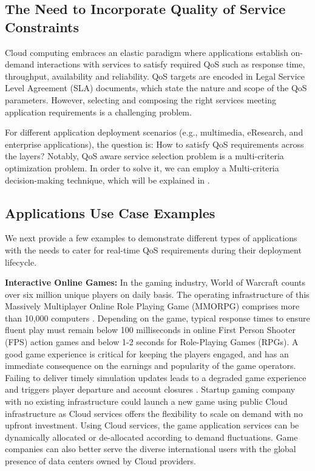 \subsection{The Need to Incorporate Quality of Service Constraints}
\label{sec:qos}

Cloud computing embraces an elastic paradigm where applications establish on-demand interactions with services to satisfy required QoS such as response time, throughput, availability and reliability. QoS targets are encoded in Legal Service Level Agreement (SLA) documents, which state the nature and scope of the QoS parameters. However, selecting and composing the right services meeting application requirements is a challenging problem.

For different application deployment scenarios (e.g., multimedia, eResearch, and enterprise applications),
the question is: How to satisfy QoS requirements across the layers?
Notably, QoS aware service selection problem \cite{Jaeger2005} is a multi-criteria optimization problem. In order to solve it, we can employ a Multi-criteria decision-making technique, which will be explained in .

\subsection{Applications Use Case Examples}
We next provide a few examples to demonstrate different types of applications with the needs to cater for real-time QoS requirements during their deployment lifecycle.

\textbf{Interactive Online Games:} In the gaming industry, World of Warcraft counts over six million unique players on daily basis. The operating infrastructure of this Massively Multiplayer Online Role Playing Game (MMORPG) comprises more than 10,000 computers \cite{nae2011dynamic}. Depending on the game, typical response times to ensure fluent play must remain below 100 milliseconds in online First Person Shooter (FPS) action games  \cite{beigbeder2004effects} and below 1-2 seconds for Role-Playing Games (RPGs). A good game experience is critical for keeping the players engaged, and has an immediate consequence on the earnings and popularity of the game operators. Failing to deliver timely simulation updates leads to a degraded game experience and triggers player departure and account closures \cite{shaikh2006demand}. Startup gaming company with no existing infrastructure could launch a new game using public Cloud infrastructure as Cloud services offers the flexibility to scale on demand with no upfront investment. Using Cloud services, the game application services can be dynamically allocated or de-allocated according to demand fluctuations. Game companies can also better serve the diverse international users with the global presence of data centers owned by Cloud providers.

